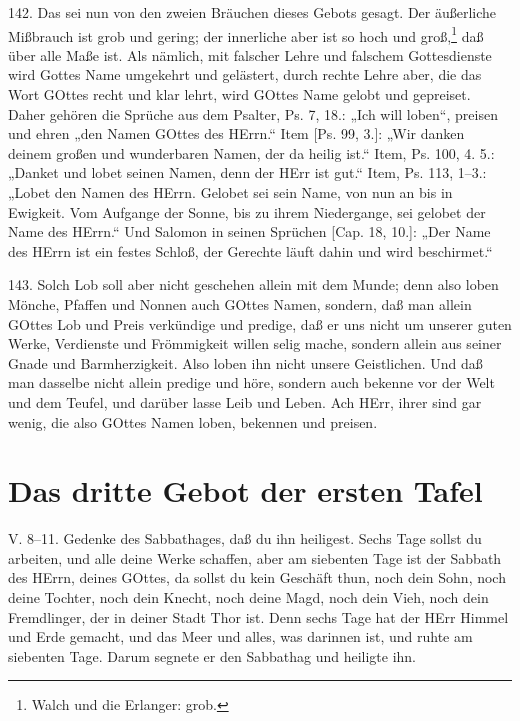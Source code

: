 142. Das sei nun von den zweien Bräuchen dieses Gebots gesagt. Der äußerliche Mißbrauch ist grob und gering; der innerliche aber ist so hoch und groß,\footnote{Walch und die Erlanger: grob.} daß über alle Maße ist. Als nämlich, mit falscher Lehre und falschem Gottesdienste wird Gottes Name umgekehrt und gelästert, durch rechte Lehre aber, die das Wort GOttes recht und klar lehrt, wird GOttes Name gelobt und gepreiset. Daher gehören die Sprüche aus dem Psalter, Ps. 7, 18.: „Ich will loben“, preisen und ehren „den Namen GOttes des HErrn.“ Item [Ps. 99, 3.]: „Wir danken deinem großen und wunderbaren Namen, der da heilig ist.“ Item, Ps. 100, 4. 5.: „Danket und lobet seinen Namen, denn der HErr ist gut.“ Item, Ps. 113, 1–3.: „Lobet den Namen des HErrn. Gelobet sei sein Name, von nun an bis in Ewigkeit. Vom Aufgange der Sonne, bis zu ihrem Niedergange, sei gelobet der Name des HErrn.“ Und Salomon in seinen Sprüchen [Cap. 18, 10.]: „Der Name des HErrn ist ein festes Schloß, der Gerechte läuft dahin und wird beschirmet.“

143. Solch Lob soll aber nicht geschehen allein mit dem Munde; denn also loben Mönche, Pfaffen und Nonnen auch GOttes Namen, sondern, daß man allein GOttes Lob und Preis verkündige und predige, daß er uns nicht um unserer guten Werke, Verdienste und Frömmigkeit willen selig mache, sondern allein aus seiner Gnade und Barmherzigkeit. Also loben ihn nicht unsere Geistlichen. Und daß man dasselbe nicht allein predige und höre, sondern auch bekenne vor der Welt und dem Teufel, und darüber lasse Leib und Leben. Ach HErr, ihrer sind gar wenig, die also GOttes Namen loben, bekennen und preisen.

\section{Das dritte Gebot der ersten Tafel}

\begin{schriftzitat}
V. 8–11. Gedenke des Sabbathages, daß du ihn heiligest. Sechs Tage sollst du arbeiten, und alle deine Werke schaffen, aber am siebenten Tage ist der Sabbath des HErrn, deines GOttes, da sollst du kein Geschäft thun, noch dein Sohn, noch deine Tochter, noch dein Knecht, noch deine Magd, noch dein Vieh, noch dein Fremdlinger, der in deiner Stadt Thor ist. Denn sechs Tage hat der HErr Himmel und Erde gemacht, und das Meer und alles, was darinnen ist, und ruhte am siebenten Tage. Darum segnete er den Sabbathag und heiligte ihn.
\end{schriftzitat}

